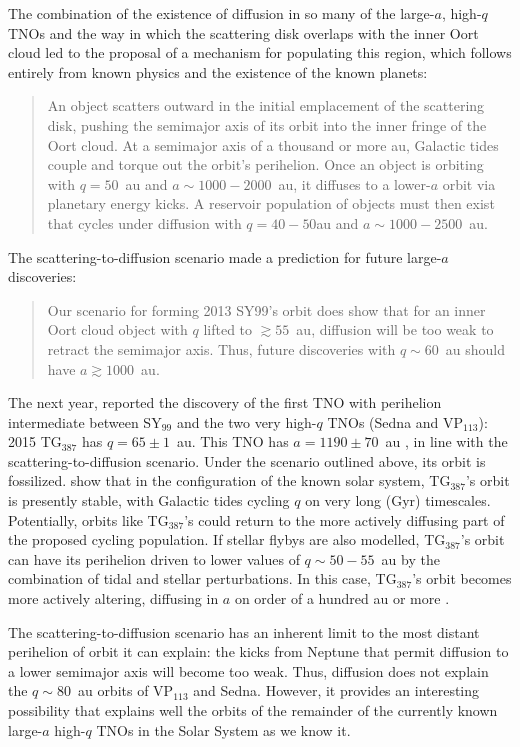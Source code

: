 \documentclass[preprint]{aastex62}
\begin{document}
The combination of the existence of diffusion in so many of the large-$a$, high-$q$ TNOs and the way in which the scattering disk overlaps with the inner Oort cloud led \citet{bannister17} to the proposal of a mechanism for populating this region, which follows entirely from known physics and the existence of the known planets:
\begin{quote}
An object scatters outward in the initial emplacement of the scattering disk, pushing the semimajor axis of its orbit into the inner fringe of the Oort cloud. At a semimajor axis of a thousand or more au, Galactic tides couple and torque out the orbit's perihelion. Once an object is orbiting with $q = 50$~au and $a\sim1000-2000$~au, it diffuses to a lower-$a$ orbit via planetary energy kicks. A reservoir population of objects must then exist that cycles under diffusion with $q = 40-50$au and $a\sim1000-2500$~au.
\end{quote}
The scattering-to-diffusion scenario made a prediction for future large-$a$ discoveries: 
\begin{quote}
    Our scenario for forming 2013 SY99's orbit does show that for an inner Oort cloud object with $q$ lifted to $\gtrsim 55$~au, diffusion will be too weak to retract the semimajor axis. Thus, future discoveries with $q\sim60$~au should have $a \gtrsim 1000$~au.
\end{quote}
The next year, \citet{sheppard18} reported the discovery of the first TNO with perihelion intermediate between SY$_{99}$ and the two very high-$q$ TNOs (Sedna and VP$_{113}$): 2015 TG$_{387}$ has $q=65 \pm 1$~au. 
This TNO has $a = 1190 \pm 70$~au \citep{sheppard18}, in line with the scattering-to-diffusion scenario.
Under the scenario outlined above, its orbit is fossilized. \citet{sheppard18} show that in the  configuration of the known solar system, TG$_{387}$'s orbit is presently stable, with Galactic tides cycling $q$ on very long (Gyr) timescales.
Potentially, orbits like TG$_{387}$'s could return to the more actively diffusing part of the proposed cycling population.
If stellar flybys are also modelled, TG$_{387}$'s orbit can have its perihelion driven to lower values of $q \sim 50-55$~au by the combination of tidal and stellar perturbations. In this case, TG$_{387}$'s orbit becomes more actively altering, diffusing in $a$ on order of a hundred au or more \citep{sheppard18}. 

The scattering-to-diffusion scenario has an inherent limit to the most distant perihelion of orbit it can explain: the kicks from Neptune that permit diffusion to a lower semimajor axis will become too weak. 
Thus, diffusion does not explain the $q \sim 80$~au orbits of VP$_{113}$ and Sedna. 
However, it provides an interesting possibility that explains well the orbits of the remainder of the currently known large-$a$ high-$q$ TNOs in the Solar System as we know it.
\end{document}
